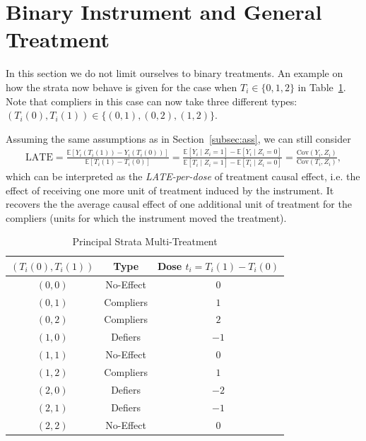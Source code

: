 \documentclass[11pt]{exam}
\theoremstyle{plain}
\newcommand{\E}{\mathbb{E}}
\newcommand{\LATE}{\mathrm{LATE}}
\newcommand{\Cov}{\mathrm{Cov}}
\begin{document}
\section{Binary Instrument and General Treatment}
In this section we do not limit ourselves to binary treatments. An example on how the strata now behave is given for the case when $T_i \in \{0, 1, 2\}$ in Table~\ref{tab:principal_strata_multi_treatment}. Note that compliers in this case can now take three different types: $(T_i(0), T_i(1)) \in \{(0, 1), (0, 2), (1, 2)\}$.

Assuming the same assumptions as in Section~\ref{subsec:ass}, we can still consider
\begin{align*}
\LATE = \frac{\E[Y_i(T_i(1)) - Y_i(T_i(0))]}{\E[T_i(1) - T_i(0)]} = \frac{\E[Y_i \mid Z_i = 1] - \E[Y_i \mid Z_i = 0]}{\E[T_i \mid Z_i = 1] - \E[T_i \mid Z_i = 0]} = \frac{\Cov(Y_i, Z_i)}{\Cov(T_i, Z_i)},
\end{align*}
which can be interpreted as the \emph{LATE-per-dose} of treatment causal effect, i.e. the effect of receiving one more unit of treatment induced by the instrument. It recovers the the average causal effect of one additional unit of treatment for the compliers (units for which the instrument moved the treatment). 

\begin{table}[h]
    \centering
    \begin{tabular}{|c|c|c|}
        \hline
         $(T_i(0), T_i(1))$ & Type & Dose $t_i = T_i(1) - T_i(0)$\\ \hline
         $(0, 0)$& No-Effect & $0$ \\ \hline
         $(0, 1)$& Compliers &  $1$\\ \hline
         $(0, 2)$& Compliers &  $2$\\ \hline
         $(1, 0)$& Defiers &  $-1$ \\ \hline
         $(1, 1)$& No-Effect &  $0$ \\ \hline
         $(1, 2)$& Compliers &  $1$ \\ \hline
         $(2, 0)$& Defiers & $-2$ \\ \hline
         $(2, 1)$& Defiers & $-1$ \\ \hline
         $(2, 2)$& No-Effect & $0$ \\ \hline
    \end{tabular}
    \caption{Principal Strata Multi-Treatment}
    \label{tab:principal_strata_multi_treatment}
\end{table}
\end{document}
